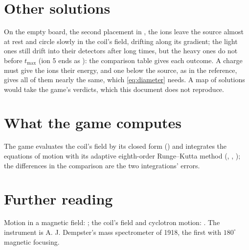 \documentclass{leveldoc}
\begin{document}
\section{Other solutions}\label{sec:others}

On the empty board, the second placement in , the ions leave the source
almost at rest and circle slowly in the coil's field, drifting along its gradient; the light
ones still drift into their detectors after long times, but the heavy ones do not before
$t_{\max}$ (ion 5 ends as ): the comparison table gives each outcome. A charge
must give the ions their energy, and one below the source, as in the reference, gives all of
them nearly the same, which \eqref{eq:diameter} needs. A map of solutions would take the game's
verdicts, which this document does not reproduce.

\section{What the game computes}\label{sec:engine}

The game evaluates the coil's field by its closed form () and integrates the
equations of motion with its adaptive eighth-order Runge--Kutta method (,
, ); the differences in the comparison are the two integrations' errors.

\section{Further reading}\label{sec:reading}

Motion in a magnetic field: ; the coil's field and cyclotron motion:
. The instrument is A. J. Dempster's mass spectrometer of 1918, the
first with $180^\circ$ magnetic focusing.

\levelfileappendix
\end{document}
